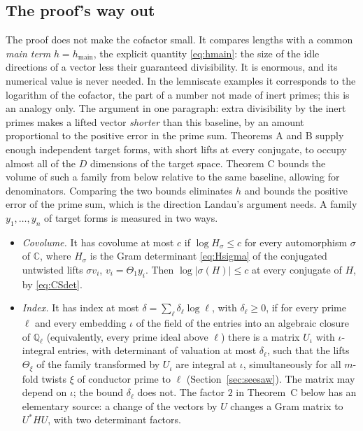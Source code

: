 \documentclass[11pt]{amsart}
\numberwithin{equation}{section}
\theoremstyle{definition}
\theoremstyle{remark}
\newcommand{\Q}{\mathbb Q}
\newcommand{\C}{\mathbb C}
\begin{document}
\subsection*{The proof's way out}
The proof does not make the cofactor small. It compares lengths with a common \emph{main term} $h=h_{\mathrm{main}}$, the explicit quantity \eqref{eq:hmain}: the size of the idle directions of a vector less their guaranteed divisibility. It is enormous, and its numerical value is never needed. In the lemniscate examples it corresponds to the logarithm of the cofactor, the part of a number not made of inert primes; this is an analogy only. The argument in one paragraph: extra divisibility by the inert primes makes a lifted vector \emph{shorter} than this baseline, by an amount proportional to the positive error in the prime sum. Theorems A and B supply enough independent target forms, with short lifts at every conjugate, to occupy almost all of the $D$ dimensions of the target space. Theorem C bounds the volume of such a family from below relative to the same baseline, allowing for denominators. Comparing the two bounds eliminates $h$ and bounds the positive error of the prime sum, which is the direction Landau's argument needs. A family $y_1,\dots,y_n$ of target forms is measured in two ways.
\begin{itemize}[leftmargin=2em]
\item \emph{Covolume.} It has covolume at most $c$ if $\log H_\sigma\le c$ for every automorphism $\sigma$ of $\C$, where $H_\sigma$ is the Gram determinant \eqref{eq:Hsigma} of the conjugated untwisted lifts $\sigma v_i$, $v_i=\Theta_1y_i$. Then $\log|\sigma(H)|\le c$ at every conjugate of $H$, by \eqref{eq:CSdet}.
\item \emph{Index.} It has index at most $\delta=\sum_\ell\delta_\ell\log\ell$, with $\delta_\ell\ge0$, if for every prime $\ell$ and every embedding $\iota$ of the field of the entries into an algebraic closure of $\Q_\ell$ (equivalently, every prime ideal above $\ell$) there is a matrix $U_\iota$ with $\iota$-integral entries, with determinant of valuation at most $\delta_\ell$, such that the lifts $\Theta_\xi$ of the family transformed by $U_\iota$ are integral at $\iota$, simultaneously for all $m$-fold twists $\xi$ of conductor prime to $\ell$ (Section~\ref{sec:seesaw}). The matrix may depend on $\iota$; the bound $\delta_\ell$ does not. The factor $2$ in Theorem~C below has an elementary source: a change of the vectors by $U$ changes a Gram matrix to $U^*\!HU$, with two determinant factors.
\end{itemize}
\end{document}
